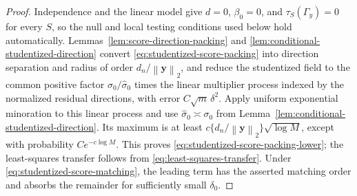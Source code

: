 \documentclass[a4paper,11pt,english]{article}
\newcommand{\norm}[1]{\left\lVert #1\right\rVert}
\begin{document}
\begin{proof}
Independence and the linear model give $d=0$, $\beta_0=0$, and
$\tau_S(\Gamma_y)=0$ for every $S$, so the null and local testing
conditions used below hold automatically.
Lemmas~\ref{lem:score-direction-packing} and
\ref{lem:conditional-studentized-direction} convert
\eqref{eq:studentized-score-packing} into direction separation and radius
of order $d_n/\norm{\mathbf y}_2$, and reduce the studentized field to the
common positive factor $\sigma_0/\hat\sigma_0$ times the linear multiplier
process indexed by the normalized residual directions, with error
$C\sqrt m\,\delta^2$.  Apply uniform exponential minoration to this
linear process and use $\hat\sigma_0\asymp\sigma_0$ from
Lemma~\ref{lem:conditional-studentized-direction}.  Its maximum is at least
$c\{d_n/\norm{\mathbf y}_2\}\sqrt{\log M}$, except with probability
$Ce^{-c\log M}$.  This proves
\eqref{eq:studentized-score-packing-lower}; the least-squares transfer
follows from \eqref{eq:least-squares-transfer}.  Under
\eqref{eq:studentized-score-matching}, the leading term has the asserted
matching order and absorbs the remainder for sufficiently small
$\delta_0$.
\end{proof}

\clearpage
\appendix

\end{document}

